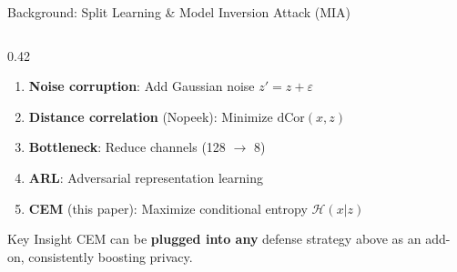 \documentclass[aspectratio=169, 10pt]{beamer}
\begin{document}
\begin{frame}{Background: Split Learning \& Model Inversion Attack (MIA)}
\begin{columns}[T]
\begin{column}{0.42\textwidth}
\vspace{0.15cm}
\small
\begin{enumerate}\setlength{\itemsep}{2pt}
    \item \textbf{Noise corruption}: Add Gaussian noise $z' = z + \varepsilon$
    \item \textbf{Distance correlation} (Nopeek): Minimize $\text{dCor}(x, z)$
    \item \textbf{Bottleneck}: Reduce channels (128 $\to$ 8)
    \item \textbf{ARL}: Adversarial representation learning
    \item \textbf{CEM} (this paper): Maximize conditional entropy $\mathcal{H}(x|z)$
\end{enumerate}

\vspace{0.15cm}
\begin{alertblock}{\small Key Insight}
\small CEM can be \textbf{plugged into any} defense strategy above as an add-on, consistently boosting privacy.
\end{alertblock}
\end{column}
\end{columns}

\end{frame}
\end{document}
